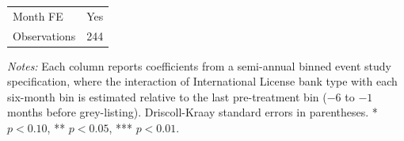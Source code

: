 \begin{table}[H]
\begin{threeparttable}
\begin{tabular}{lcccc}
Month FE & \multicolumn{4}{c}{Yes} \\
Observations & \multicolumn{4}{c}{244} \\
\bottomrule
\end{tabular}
\begin{tablenotes}[flushleft]
\small
\item \textit{Notes:} Each column reports coefficients from a semi-annual binned event study specification, where the interaction of International License bank type with each six-month bin is estimated relative to the last pre-treatment bin ($-6$ to $-1$ months before grey-listing). Driscoll-Kraay standard errors in parentheses. * $p<0.10$, ** $p<0.05$, *** $p<0.01$.
\end{tablenotes}
\end{threeparttable}
\end{table}
